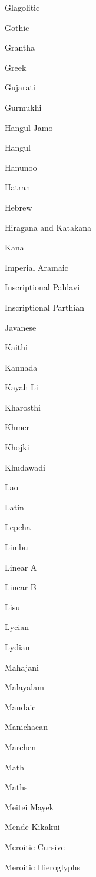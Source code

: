 \begin{table}[!hbp]
\begin{multicols}{4}
    Glagolitic \par
    Gothic \par
    Grantha \par
    Greek \par
    Gujarati \par
    Gurmukhi \par
    Hangul Jamo \par
    Hangul \par
    Hanunoo \par
    Hatran \par
    Hebrew \par
    \dup Hiragana and Katakana \par
    \dup Kana \par
    Imperial Aramaic \par
    Inscriptional Pahlavi \par
    Inscriptional Parthian \par
    Javanese \par
    Kaithi \par
    Kannada \par
    Kayah Li \par
    Kharosthi \par
    Khmer \par
    Khojki \par
    Khudawadi \par
    Lao \par
    Latin \par
    Lepcha \par
    Limbu \par
    Linear A \par
    Linear B \par
    Lisu \par
    Lycian \par
    Lydian \par
    Mahajani \par
    Malayalam \par
    Mandaic \par
    Manichaean \par
    Marchen \par
    \dup Math \par
    \dup Maths \par
    Meitei Mayek \par
    Mende Kikakui \par
    Meroitic Cursive \par
    Meroitic Hieroglyphs \par

\end{multicols}
\end{table}
